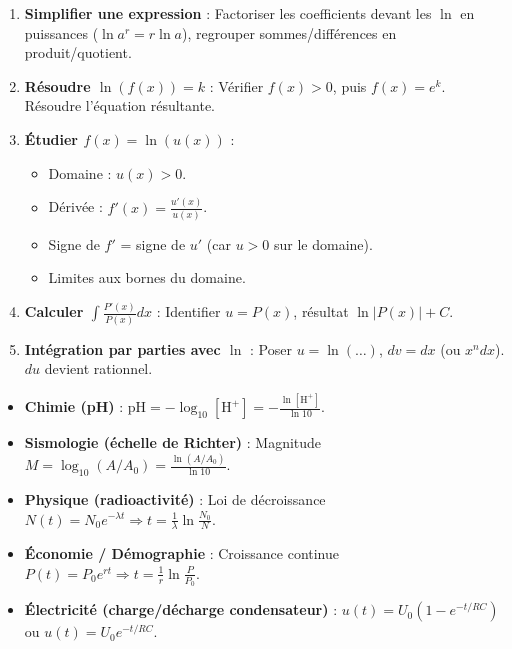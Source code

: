 \documentclass[11pt]{article}
\begin{document}
\begin{methode}
\begin{enumerate}
  \item \textbf{Simplifier une expression} : Factoriser les coefficients devant les $\ln$ en puissances ($\ln a^r=r\ln a$), regrouper sommes/différences en produit/quotient.
  \item \textbf{Résoudre $\ln(f(x))=k$} : Vérifier $f(x)>0$, puis $f(x)=e^k$. Résoudre l'équation résultante.
  \item \textbf{Étudier $f(x)=\ln(u(x))$} :
    \begin{itemize}
      \item Domaine : $u(x)>0$.
      \item Dérivée : $f'(x)=\frac{u'(x)}{u(x)}$.
      \item Signe de $f'$ = signe de $u'$ (car $u>0$ sur le domaine).
      \item Limites aux bornes du domaine.
    \end{itemize}
  \item \textbf{Calculer $\int \frac{P'(x)}{P(x)}dx$} : Identifier $u=P(x)$, résultat $\ln|P(x)|+C$.
  \item \textbf{Intégration par parties avec $\ln$} : Poser $u=\ln(\dots)$, $dv=dx$ (ou $x^n dx$). $du$ devient rationnel.
\end{enumerate}
\end{methode}

\begin{savaistu}
\begin{itemize}
  \item \textbf{Chimie (pH)} : $\mathrm{pH} = -\log_{10}[\mathrm{H}^+] = -\frac{\ln[\mathrm{H}^+]}{\ln 10}$.
  \item \textbf{Sismologie (échelle de Richter)} : Magnitude $M = \log_{10}(A/A_0) = \frac{\ln(A/A_0)}{\ln 10}$.
  \item \textbf{Physique (radioactivité)} : Loi de décroissance $N(t)=N_0 e^{-\lambda t} \Rightarrow t = \frac{1}{\lambda}\ln\frac{N_0}{N}$.
  \item \textbf{Économie / Démographie} : Croissance continue $P(t)=P_0 e^{rt} \Rightarrow t = \frac{1}{r}\ln\frac{P}{P_0}$.
  \item \textbf{Électricité (charge/décharge condensateur)} : $u(t)=U_0(1-e^{-t/RC})$ ou $u(t)=U_0 e^{-t/RC}$.
\end{itemize}
\end{savaistu}
\end{document}
